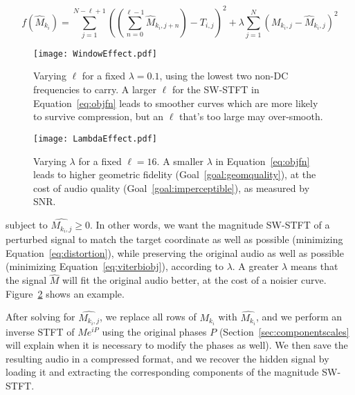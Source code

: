 \documentclass[runningheads]{llncs}
\begin{document}
\begin{equation}
  \label{eq:objfn}
  f(\hat{M}_{k_i}) = \sum_{j=1}^{N-\ell+1} \left( \left( \sum_{n = 0}^{\ell-1} \hat{M}_{k_i, j+n} \right) - T_{i, j} \right)^2 + \lambda \sum_{j=1}^N \left( M_{k_i, j} - \hat{M}_{k_i, j} \right)^2
\end{equation}



\begin{figure}
  \centering
  \texttt{[image: WindowEffect.pdf]}
  \caption{Varying $\ell$ for a fixed $\lambda=0.1$, using the lowest two non-DC frequencies to carry.  A larger $\ell$ for the SW-STFT in Equation~\ref{eq:objfn} leads to smoother curves which are more likely to survive compression, but an $\ell$ that's too large may over-smooth.}
  \label{fig:WindowEffect}
\end{figure}

\begin{figure}
  \centering
  \texttt{[image: LambdaEffect.pdf]}
  \caption{Varying $\lambda$ for a fixed $\ell=16$.  A smaller $\lambda$ in Equation~\ref{eq:objfn} leads to higher geometric fidelity (Goal~\ref{goal:geomquality}), at the cost of audio quality (Goal~\ref{goal:imperceptible}), as measured by SNR.}
  \label{fig:LambdaEffect}
\end{figure}



subject to $\hat{M_{k_i, j}} \geq 0$.  In other words, we want the magnitude SW-STFT of a perturbed signal to match the target coordinate as well as possible (minimizing Equation~\ref{eq:distortion}), while preserving the original audio as well as possible (minimizing Equation~\ref{eq:viterbiobj}), according to $\lambda$.  A greater $\lambda$ means that the signal $\hat{M}$ will fit the original audio better, at the cost of a noisier curve.  Figure~\ref{fig:LambdaEffect} shows an example.

After solving for $\hat{M_{k_i, j}}$, we replace all rows of $M_{k_i}$ with $\hat{M_{k_i}}$, and we perform an inverse STFT of $M e^{i P}$ using the original phases $P$ (Section~\ref{sec:componentscales} will explain when it is necessary to modify the phases as well).  We then save the resulting audio in a compressed format, and we recover the hidden signal by loading it and extracting the corresponding components of the magnitude SW-STFT.
\end{document}
